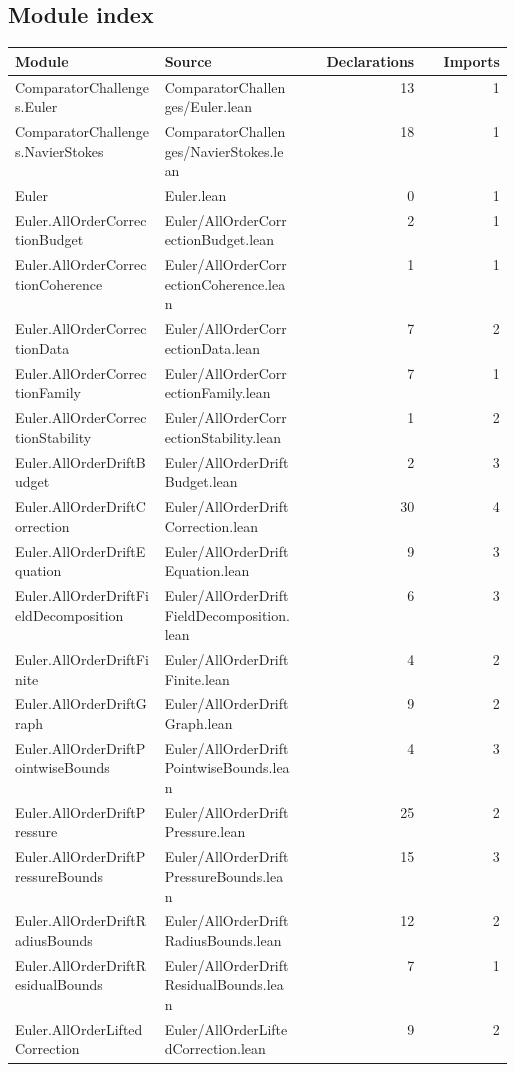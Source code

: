 \subsection{Module index}
\begin{longtable}{p{0.30\linewidth}p{0.28\linewidth}rr}
Module & Source & Declarations & Imports\\\hline
ComparatorChallenges.Euler & ComparatorChallenges/Euler.lean & 13 & 1\\
ComparatorChallenges.NavierStokes & ComparatorChallenges/NavierStokes.lean & 18 & 1\\
Euler & Euler.lean & 0 & 1\\
Euler.AllOrderCorrectionBudget & Euler/AllOrderCorrectionBudget.lean & 2 & 1\\
Euler.AllOrderCorrectionCoherence & Euler/AllOrderCorrectionCoherence.lean & 1 & 1\\
Euler.AllOrderCorrectionData & Euler/AllOrderCorrectionData.lean & 7 & 2\\
Euler.AllOrderCorrectionFamily & Euler/AllOrderCorrectionFamily.lean & 7 & 1\\
Euler.AllOrderCorrectionStability & Euler/AllOrderCorrectionStability.lean & 1 & 2\\
Euler.AllOrderDriftBudget & Euler/AllOrderDriftBudget.lean & 2 & 3\\
Euler.AllOrderDriftCorrection & Euler/AllOrderDriftCorrection.lean & 30 & 4\\
Euler.AllOrderDriftEquation & Euler/AllOrderDriftEquation.lean & 9 & 3\\
Euler.AllOrderDriftFieldDecomposition & Euler/AllOrderDriftFieldDecomposition.lean & 6 & 3\\
Euler.AllOrderDriftFinite & Euler/AllOrderDriftFinite.lean & 4 & 2\\
Euler.AllOrderDriftGraph & Euler/AllOrderDriftGraph.lean & 9 & 2\\
Euler.AllOrderDriftPointwiseBounds & Euler/AllOrderDriftPointwiseBounds.lean & 4 & 3\\
Euler.AllOrderDriftPressure & Euler/AllOrderDriftPressure.lean & 25 & 2\\
Euler.AllOrderDriftPressureBounds & Euler/AllOrderDriftPressureBounds.lean & 15 & 3\\
Euler.AllOrderDriftRadiusBounds & Euler/AllOrderDriftRadiusBounds.lean & 12 & 2\\
Euler.AllOrderDriftResidualBounds & Euler/AllOrderDriftResidualBounds.lean & 7 & 1\\
Euler.AllOrderLiftedCorrection & Euler/AllOrderLiftedCorrection.lean & 9 & 2\\

\end{longtable}
